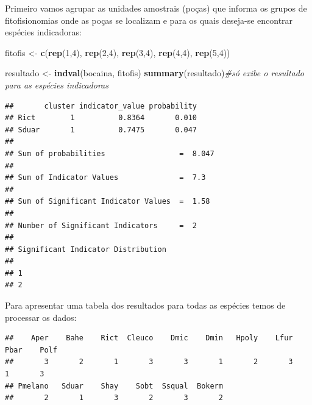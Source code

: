 \documentclass[
]{book}
\newenvironment{Shaded}{\begin{snugshade}}{\end{snugshade}}
\newcommand{\CommentTok}[1]{\textcolor[rgb]{0.56,0.35,0.01}{\textit{#1}}}
\newcommand{\DecValTok}[1]{\textcolor[rgb]{0.00,0.00,0.81}{#1}}
\newcommand{\KeywordTok}[1]{\textcolor[rgb]{0.13,0.29,0.53}{\textbf{#1}}}
\newcommand{\NormalTok}[1]{#1}
\newcommand{\OperatorTok}[1]{\textcolor[rgb]{0.81,0.36,0.00}{\textbf{#1}}}
\newcommand{\StringTok}[1]{\textcolor[rgb]{0.31,0.60,0.02}{#1}}
\begin{document}
Primeiro vamos agrupar as unidades amostrais (poças) que informa os grupos de fitofisionomias onde as poças se localizam e para os quais deseja-se encontrar espécies indicadoras:

\begin{Shaded}
\begin{Highlighting}[]
\NormalTok{fitofis <-}\StringTok{ }\KeywordTok{c}\NormalTok{(}\KeywordTok{rep}\NormalTok{(}\DecValTok{1}\NormalTok{,}\DecValTok{4}\NormalTok{), }\KeywordTok{rep}\NormalTok{(}\DecValTok{2}\NormalTok{,}\DecValTok{4}\NormalTok{), }\KeywordTok{rep}\NormalTok{(}\DecValTok{3}\NormalTok{,}\DecValTok{4}\NormalTok{), }\KeywordTok{rep}\NormalTok{(}\DecValTok{4}\NormalTok{,}\DecValTok{4}\NormalTok{), }\KeywordTok{rep}\NormalTok{(}\DecValTok{5}\NormalTok{,}\DecValTok{4}\NormalTok{))}
\end{Highlighting}
\end{Shaded}

\begin{Shaded}
\begin{Highlighting}[]
\NormalTok{resultado <-}\StringTok{ }\KeywordTok{indval}\NormalTok{(bocaina, fitofis)}
\KeywordTok{summary}\NormalTok{(resultado)}\CommentTok{#só exibe o resultado para as espécies indicadoras}
\end{Highlighting}
\end{Shaded}

\begin{verbatim}
##       cluster indicator_value probability
## Rict        1          0.8364       0.010
## Sduar       1          0.7475       0.047
## 
## Sum of probabilities                 =  8.047 
## 
## Sum of Indicator Values              =  7.3 
## 
## Sum of Significant Indicator Values  =  1.58 
## 
## Number of Significant Indicators     =  2 
## 
## Significant Indicator Distribution
## 
## 1 
## 2
\end{verbatim}

Para apresentar uma tabela dos resultados para todas as espécies temos de processar os dados:

\begin{Shaded}
\end{Shaded}

\begin{verbatim}
##    Aper    Bahe    Rict  Cleuco    Dmic    Dmin   Hpoly    Lfur    Pbar    Polf 
##       3       2       1       3       3       1       2       3       1       3 
## Pmelano   Sduar    Shay    Sobt  Ssqual  Bokerm 
##       2       1       3       2       3       2
\end{verbatim}
\end{document}
